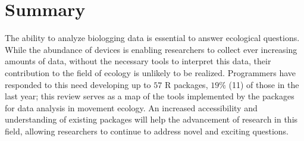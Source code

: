 \documentclass[a4paper,12pt]{article}
\newcommand{\Rpkg}[1]{\texttt{#1}}
\begin{document}
{\section*{Summary}

The ability to analyze biologging data is essential to answer ecological questions. While the abundance of devices is enabling researchers to collect ever increasing amounts of data, without the necessary tools to interpret this data, their contribution to the field of ecology is unlikely to be realized. Programmers have responded to this need developing up to $57$ R packages, $19\%$ (11) of those in the last year; this review serves as a map of the tools implemented by the packages for data analysis in movement ecology. An increased accessibility and understanding of existing packages will help the advancement of research in this field, allowing researchers to continue to address novel and exciting questions. 
%
%

}
\end{document}
